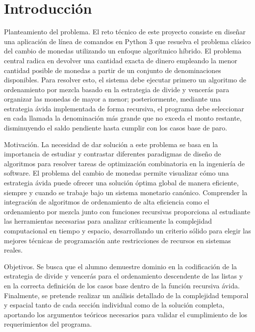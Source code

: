 \section{Introducción}

Planteamiento del problema. El reto técnico de este proyecto consiste en diseñar una aplicación de línea de comandos en Python 3 que resuelva el problema clásico del cambio de monedas utilizando un enfoque algorítmico híbrido. El problema central radica en devolver una cantidad exacta de dinero empleando la menor cantidad posible de monedas a partir de un conjunto de denominaciones disponibles. Para resolver esto, el sistema debe ejecutar primero un algoritmo de ordenamiento por mezcla basado en la estrategia de divide y vencerás para organizar las monedas de mayor a menor; posteriormente, mediante una estrategia ávida implementada de forma recursiva, el programa debe seleccionar en cada llamada la denominación más grande que no exceda el monto restante, disminuyendo el saldo pendiente hasta cumplir con los casos base de paro.

\vspace{0.4cm}

Motivación. La necesidad de dar solución a este problema se basa en la importancia de estudiar y contrastar diferentes paradigmas de diseño de algoritmos para resolver tareas de optimización combinatoria en la ingeniería de software. El problema del cambio de monedas permite visualizar cómo una estrategia ávida puede ofrecer una solución óptima global de manera eficiente, siempre y cuando se trabaje bajo un sistema monetario canónico. Comprender la integración de algoritmos de ordenamiento de alta eficiencia como el ordenamiento por mezcla junto con funciones recursivas proporciona al estudiante las herramientas necesarias para analizar críticamente la complejidad computacional en tiempo y espacio, desarrollando un criterio sólido para elegir las mejores técnicas de programación ante restricciones de recursos en sistemas reales.

\vspace{0.4cm}

Objetivos. Se busca que el alumno demuestre dominio en la codificación de la estrategia de divide y vencerás para el ordenamiento descendente de las listas y en la correcta definición de los casos base dentro de la función recursiva ávida. Finalmente, se pretende realizar un análisis detallado de la complejidad temporal y espacial tanto de cada sección individual como de la solución completa, aportando los argumentos teóricos necesarios para validar el cumplimiento de los requerimientos del programa.